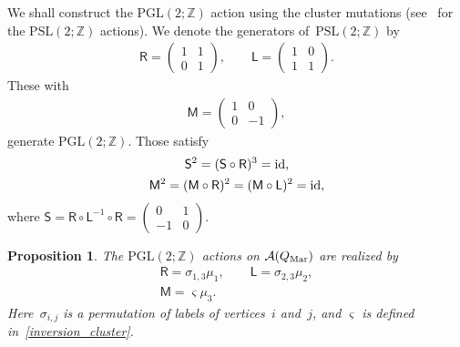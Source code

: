 \documentclass[10pt,a4paper]{amsart}
\numberwithin{equation}{section}
\newtheorem{Proposition}[Theorem]{Proposition}
 { \theoremstyle{definition}
\newtheorem{Definition}[Theorem]{Definition}
\newtheorem{Note}[Theorem]{Note}
\newtheorem{Example}[Theorem]{Example}
\newtheorem{Remark}[Theorem]{Remark} }
\begin{document}
We shall construct the $\mathrm{PGL}(2;\mathbb{Z})$ action using the cluster mutations (see~\cite{HikamiRInoue12a,NagaTeraYama11a} for the $\mathrm{PSL}(2;\mathbb{Z})$ actions). We denote the generators of~$\mathrm{PSL}(2;\mathbb{Z})$ by
\begin{gather*} %
 \mathsf{R}= \begin{pmatrix}
 1 & 1 \\
 0 & 1
 \end{pmatrix},
 \qquad
 \mathsf{L} = \begin{pmatrix}
 1 & 0 \\
 1 & 1
 \end{pmatrix} .
\end{gather*}
These with
\begin{gather*} %
 \mathsf{M}=
 \begin{pmatrix}
 1 & 0 \\
 0 & -1
 \end{pmatrix} ,
\end{gather*}
generate $\mathrm{PGL}(2;\mathbb{Z})$. Those satisfy
\begin{gather} \label{def_PSL}
 \mathsf{S}^2= (\mathsf{S} \circ \mathsf{R})^3 = {\rm id}, \\
 \label{def_PGL}
 \mathsf{M}^2 = ( \mathsf{M} \circ \mathsf{R} )^2 = ( \mathsf{M} \circ \mathsf{L} )^2 = {\rm id},
\end{gather}
where $\mathsf{S}=\mathsf{R} \circ \mathsf{L}^{-1} \circ \mathsf{R}=\left( \begin{smallmatrix} 0 & 1 \\ -1 & 0 \end{smallmatrix}\right)$.

\begin{Proposition} The $\mathrm{PGL}(2;\mathbb{Z})$ actions on $\mathcal{A}(Q_{\text{\rm Mar}})$ are realized by
 \begin{gather} \label{RL_torus}
 \mathsf{R} = \sigma_{1,3} \mu_1, \qquad \mathsf{L} = \sigma_{2,3} \mu_2 , \\
 \mathsf{M}= \varsigma \mu_3 .\nonumber
 \end{gather}
 Here~$\sigma_{i,j}$ is a permutation of labels of vertices~$i$ and~$j$, and $\varsigma$ is defined in~\eqref{inversion_cluster}.
\end{Proposition}
\end{document}
